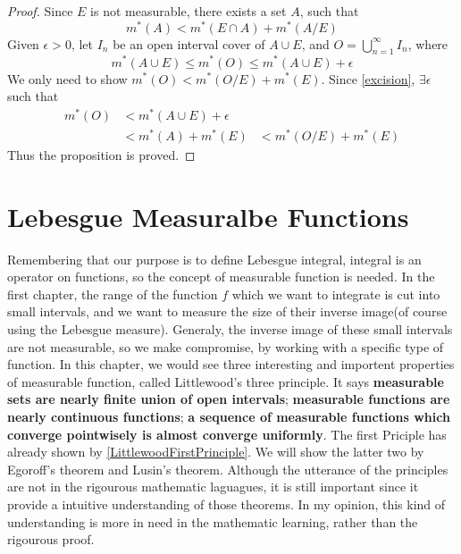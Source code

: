 \documentclass[lang=en, 12pt]{elegantbook}
\begin{document}
            \begin{proof}
                Since $E$ is not measurable, there exists a set $A$, such that 
                \begin{equation}\label{excision}
                    m^*(A) < m^*(E \cap A) + m^*(A / E)
                \end{equation}
                Given $\epsilon > 0$, let $I_n$ be an open interval cover of $A \cup E$, and $O = \bigcup_{n=1}^{\infty} I_n$, where
            $$m^*(A \cup E) \leq m^*(O) \leq m^*(A \cup E) + \epsilon$$ 
                We only need to show $m^*(O)<m^*(O/E) + m^*(E)$. Since \eqref{excision}, $\exists \epsilon$ such that  
                \begin{equation*}
                    \begin{aligned}
                        m^*(O) &< m^*(A \cup E) + \epsilon \\
                        &< m^*(A) + m^*(E)
                        &< m^*(O/E) + m^*(E)
                    \end{aligned}
                \end{equation*}
                Thus the proposition is proved.
            \end{proof}

    \chapter{Lebesgue Measuralbe Functions}
            Remembering that our purpose is to define Lebesgue integral, integral is an operator on functions, so the concept of measurable function
        is needed. In the first chapter, the range of the function $f$ which we want to integrate is cut into small intervals, and we want to 
        measure the size of their inverse image(of course using the Lebesgue measure). Generaly, the inverse image of these small intervals are not
        measurable, so we make compromise, by working with a specific type of function. 
            In this chapter, we would see three interesting and importent properties of measurable function, called Littlewood's three principle. It
        says \textbf{measurable sets are nearly finite union of open intervals}; \textbf{measurable functions are nearly continuous functions};
        \textbf{a sequence of measurable functions which converge pointwisely is almost converge uniformly}. The first Priciple has already 
        shown by \eqref{LittlewoodFirstPrinciple}. We will show the latter two by Egoroff's theorem and Lusin's theorem. Although the 
        utterance of the principles are not in the rigourous mathematic laguagues, it is still important since it provide a intuitive 
        understanding of those theorems. In my opinion, this kind of understanding is more in need in the mathematic learning, rather than
        the rigourous proof.
\end{document}
